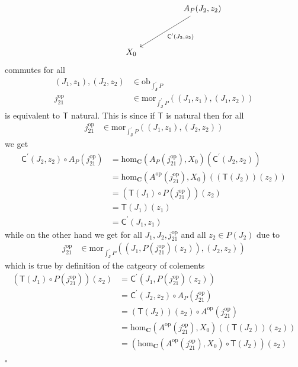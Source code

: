 \begin{prf}
\begin{enumerate}
\[\begin{tikzcd}[sep=huge]
  &
  &
  A_{P}(J_{2},z_{2})
  \arrow{dl}{\mathsf{C}^{\prime}(J_{2},z_{2})}
  \\
  &
  X_{0}
  &
\end{tikzcd}
\]
commutes for all
\begin{align*}
  (J_{1},z_{1}),
  (J_{2},z_{2})
  &\in
  \mathrm{ob}_{\int_{\mathbf{J}}^{\prime}P}
  \\
  j_{21}^{\textrm{op}}
  &\in
  \mathrm{mor}_{\int_{\mathbf{J}}^{\prime}P}
  \left(
    (J_{1},z_{1}),
    (J_{1},z_{2})
  \right)
\end{align*}
is equivalent to $\mathsf{T}$ natural. This is since if $\mathsf{T}$ is natural then for all
\begin{align*}
  j_{21}^{\textrm{op}}
  &\in
  \mathrm{mor}_{\int_{\mathbf{J}}^{\prime}P}
  \left(
    (J_{1},z_{1}),
    (J_{2},z_{2})
  \right)
\end{align*}
we get
\begin{align*}
  \mathsf{C}^{\prime}(J_{2},z_{2})
  \circ
  A_{P}(j_{21}^{\textrm{op}})
  &=
  \mathrm{hom}_{\mathbf{C}}
  \left(
    A_{P}(j_{21}^{\textrm{op}}),
    X_{0}
  \right)
  \left(
    \mathsf{C}^{\prime}(J_{2},z_{2})
  \right)
  \\
  &=
  \mathrm{hom}_{\mathbf{C}}
  \left(
    A^{\textrm{op}}(j_{21}^{\textrm{op}}),
    X_{0}
  \right)
  \left(
    (\mathsf{T}(J_{2}))(z_{2})
  \right)
  \\
  &=
  \left(
    \mathsf{T}(J_{1})
    \circ
    P(j_{21}^{\textrm{op}})
  \right)
  (z_{2})
  \tag{NT}
  \\
  &=
  \mathsf{T}(J_{1})(z_{1})
  \\
  &=
  \mathsf{C}^{\prime}(J_{1},z_{1})
\end{align*}
while on the other hand we get for all $J_{1},J_{2},j_{21}^{\textrm{op}}$ and all $z_{2} \in P(J_{2})$ due to
\begin{align*}
  j_{21}^{\textrm{op}}
  &\in
  \mathrm{mor}_{\int_{\mathbf{J}}^{\prime}P}
  \left(
    (J_{1},P(j_{21}^{\textrm{op}})(z_{2})),
    (J_{2},z_{2})
  \right)
\end{align*}
which is true by definition of the catgeory of colements
\begin{align*}
  \left(
    \mathsf{T}(J_{1})
    \circ
    P(j_{21}^{\textrm{op}})
  \right)
  (z_{2})
  &=
  \mathsf{C}^{\prime}
  \left(
    J_{1},
    P(j_{21}^{\textrm{op}})(z_{2})
  \right)
  \\
  &=
  \mathsf{C}^{\prime}
  \left(
    J_{2},
    z_{2}
  \right)
  \circ
  A_{P}(j_{21}^{\textrm{op}})
  \\
  &=
  (\mathsf{T}(J_{2}))(z_{2})
  \circ
  A^{\textrm{op}}(j_{21}^{\textrm{op}})
  \\
  &=
  \mathrm{hom}_{\mathbf{C}}
  \left(
    A^{\textrm{op}}(j_{21}^{\textrm{op}}),
    X_{0}
  \right)
  \left(
    (\mathsf{T}(J_{2}))(z_{2})
  \right)
  \\
  &=
  \left(
    \mathrm{hom}_{\mathbf{C}}
    \left(
      A^{\textrm{op}}(j_{21}^{\textrm{op}}),
      X_{0}
    \right)
    \circ
    \mathsf{T}(J_{2})
  \right)
  \left(
    z_{2}
  \right)
\end{align*}
\end{enumerate}
\phantom{proven}
\hfill
$\square$
\end{prf}
